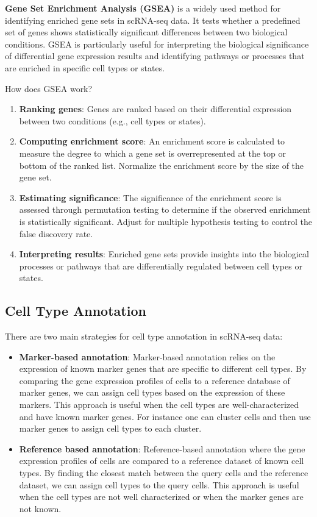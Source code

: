 \documentclass[a4paper]{article}
\begin{document}
\textbf{Gene Set Enrichment Analysis (GSEA)} is a widely used method for
identifying enriched gene sets in scRNA-seq data. It tests whether a
predefined set of genes shows statistically significant differences
between two biological conditions. GSEA is particularly useful for
interpreting the biological significance of differential gene expression
results and identifying pathways or processes that are enriched in
specific cell types or states.

How does GSEA work?

\begin{enumerate}
  \item \textbf{Ranking genes}: Genes are ranked based on their differential
  expression between two conditions (e.g., cell types or states).
  \item \textbf{Computing enrichment score}: An enrichment score is calculated
  to measure the degree to which a gene set is overrepresented at the top
  or bottom of the ranked list. Normalize the enrichment score by the size
  of the gene set. 
  \item \textbf{Estimating significance}: The significance of the enrichment
  score is assessed through permutation testing to determine if the observed
  enrichment is statistically significant. Adjust for multiple hypothesis
  testing to control the false discovery rate.
  \item \textbf{Interpreting results}: Enriched gene sets provide insights
  into the biological processes or pathways that are differentially regulated
  between cell types or states.
\end{enumerate}

\subsection*{Cell Type Annotation}

There are two main strategies for cell type annotation in scRNA-seq data:

\begin{itemize}
  \item \textbf{Marker-based annotation}: Marker-based annotation relies
  on the expression of known marker genes that are specific to different
  cell types. By comparing the gene expression profiles of cells to a
  reference database of marker genes, we can assign cell types based on
  the expression of these markers. This approach is useful when the
  cell types are well-characterized and have known marker genes. For instance
  one can cluster cells and then use marker genes to assign cell types to
  each cluster.

  \item \textbf{Reference based annotation}: Reference-based annotation
  where the gene expression profiles of cells are compared to a reference
  dataset of known cell types. By finding the closest match between the
  query cells and the reference dataset, we can assign cell types to the
  query cells. This approach is useful when the cell types are not well
  characterized or when the marker genes are not known.
\end{itemize}
\end{document}
